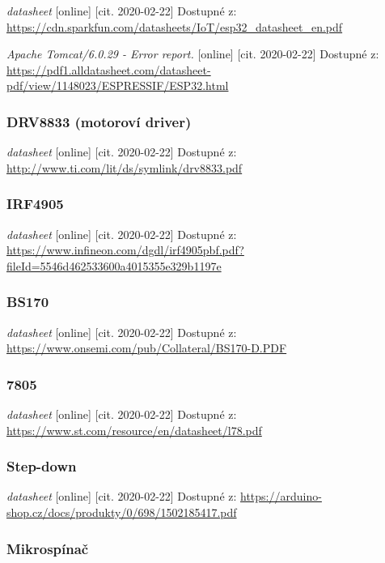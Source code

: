 \documentclass{template/socthesis}
\begin{document}
\begin{thebibliography}{1}
	\textit{datasheet} [online] [cit. 2020-02-22] Dostupné z:
	\url{https://cdn.sparkfun.com/datasheets/IoT/esp32_datasheet_en.pdf}
	
	\textit{Apache Tomcat/6.0.29 - Error report.} [online] [cit. 2020-02-22] Dostupné z:
	\url{https://pdf1.alldatasheet.com/datasheet-pdf/view/1148023/ESPRESSIF/ESP32.html}
	
	\subsubsection{DRV8833 (motoroví driver)}
	
	\textit{datasheet} [online] [cit. 2020-02-22] Dostupné z:
	\url{http://www.ti.com/lit/ds/symlink/drv8833.pdf}
	
	\subsubsection{IRF4905}
	
	\textit{datasheet} [online] [cit. 2020-02-22] Dostupné z:
	\url{https://www.infineon.com/dgdl/irf4905pbf.pdf?fileId=5546d462533600a4015355e329b1197e}
	
	\subsubsection{BS170}
	
	\textit{datasheet} [online] [cit. 2020-02-22] Dostupné z:
	\url{https://www.onsemi.com/pub/Collateral/BS170-D.PDF}
	
	\subsubsection{7805}
	
	\textit{datasheet} [online] [cit. 2020-02-22] Dostupné z:
	\url{https://www.st.com/resource/en/datasheet/l78.pdf}
	
	\subsubsection{Step-down}
	
	\textit{datasheet} [online] [cit. 2020-02-22] Dostupné z:
	\url{https://arduino-shop.cz/docs/produkty/0/698/1502185417.pdf}
	
	\subsubsection{Mikrospínač}
	

\end{thebibliography}
\end{document}
